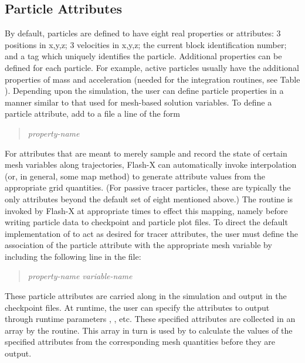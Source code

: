 \subsection{Particle Attributes}
\label{Sec:Particle Properties}

By default, particles are defined to have eight real properties or attributes:  3 positions in x,y,z; 3 velocities
in x,y,z; the current block identification number; 
and a tag which uniquely identifies the particle.
Additional properties can be defined for each particle.  For example, active particles usually
have the additional properties of mass and acceleration (needed for the integration routines, see
Table ).
Depending upon the simulation, the user can define particle properties
in a manner similar to that used
for mesh-based solution variables.
To define a particle attribute, add to
a  file a line of the form
\begin{quote}
 {\it property-name}
\end{quote}

For attributes that are meant to merely sample and record the state of
certain mesh variables along trajectories, Flash-X can automatically
invoke interpolation (or, in general, some map method) to generate
attribute values from the appropriate grid quantities.
(For passive tracer particles, these are typically the only attributes
beyond the default set of eight mentioned above.)
The routine  is invoked
by Flash-X at appropriate times to effect this mapping, namely before
writing particle data to checkpoint and particle plot files.
To direct the default implementation of 
to act as desired for tracer attributes, the user must define 
the association of the particle attribute
with the appropriate mesh variable by including the following line in
the  file:
\begin{quote}
 {\it property-name}  {\it variable-name}
\end{quote}

These particle attributes are carried along in the simulation and
output in the checkpoint files. At runtime, the user can specify the attributes
to output through runtime parameters 
\newline
{},
, etc. These specified attributes
are collected in an array by the 
routine. This array in turn is used by
 to calculate the values of the
specified attributes from the corresponding mesh quantities before
they are output.  

